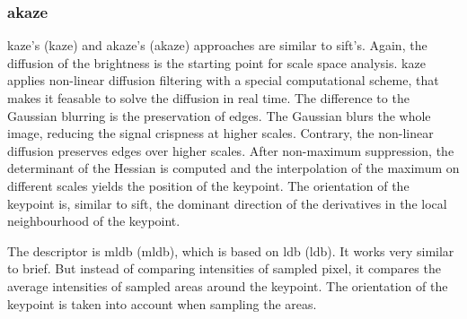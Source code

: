 \subsubsection{\acrshort{akaze}}

\acrshort{kaze}'s\cite{alcantarilla_eccv12} (\acrlong{kaze}) and \acrshort{akaze}\cite{alcantarilla_bmva13}'s (\acrlong{akaze}) approaches are similar to \acrshort{sift}'s.
Again, the diffusion of the brightness is the starting point for scale space analysis.
\acrshort{kaze} applies non-linear diffusion filtering with a special computational scheme, that makes it feasable to solve the diffusion in real time.
The difference to the Gaussian blurring is the preservation of edges.
The Gaussian blurs the whole image, reducing the signal crispness at higher scales.
Contrary, the non-linear diffusion preserves edges over higher scales.
After non-maximum suppression, the determinant of the Hessian is computed and the interpolation of the maximum on different scales yields the position of the keypoint.
The orientation of the keypoint is, similar to \acrshort{sift}, the dominant direction of the derivatives in the local neighbourhood of the keypoint.

The descriptor is \acrshort{mldb} (\acrlong{mldb}), which is based on \acrshort{ldb}\cite{yang_ismar12} (\acrlong{ldb}).
It works very similar to \acrshort{brief}.
But instead of comparing intensities of sampled pixel, it compares the average intensities of sampled areas around the keypoint.
The orientation of the keypoint is taken into account when sampling the areas.

